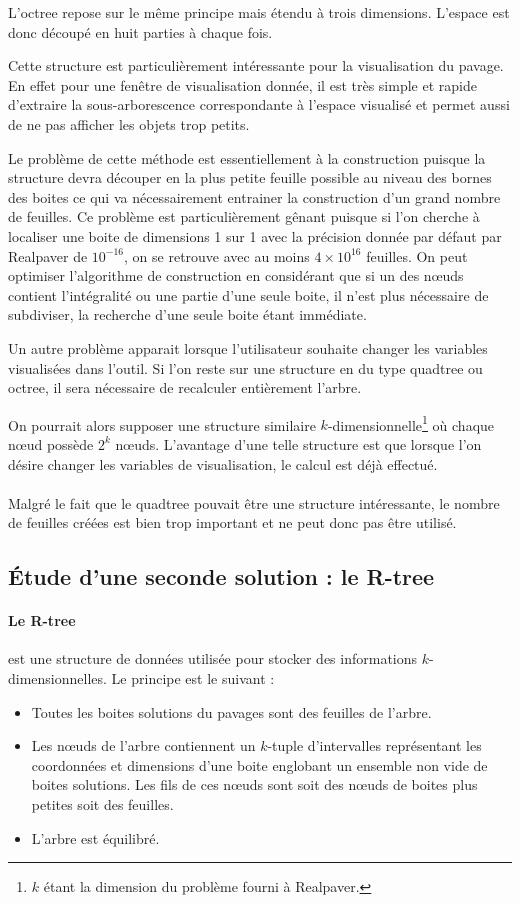 \documentclass[11pt,a4paper,utf8x]{report}
\begin{document}
L'octree repose sur le même principe mais étendu à trois dimensions. L'espace est donc découpé en huit parties à chaque fois.

Cette structure est particulièrement intéressante pour la visualisation du pavage. En effet pour une fenêtre de visualisation donnée, il est très simple et rapide d'extraire la sous-arborescence correspondante à l'espace visualisé et permet aussi de ne pas afficher les objets trop petits.

Le problème de cette méthode est essentiellement à la construction puisque la structure devra découper en la plus petite feuille possible au niveau des bornes des boites ce qui va nécessairement entrainer la construction d'un grand nombre de feuilles. Ce problème est particulièrement gênant puisque si l'on cherche à localiser une boite de dimensions 1 sur 1 avec la précision donnée par défaut par Realpaver de $10^{-16}$, on se retrouve avec au moins $4 \times 10^{16}$ feuilles. On peut optimiser l'algorithme de construction en considérant que si un des nœuds contient l'intégralité ou une partie d'une seule boite, il n'est plus nécessaire de subdiviser, la recherche d'une seule boite étant immédiate.

Un autre problème apparait lorsque l'utilisateur souhaite changer les variables visualisées dans l'outil. Si l'on reste sur une structure en du type quadtree ou octree, il sera nécessaire de recalculer entièrement l'arbre.

On pourrait alors supposer une structure similaire $k$-dimensionnelle\footnote{$k$ étant la dimension du problème fourni à Realpaver.} où chaque nœud possède $2^k$ nœuds. L'avantage d'une telle structure est que lorsque l'on désire changer les variables de visualisation, le calcul est déjà effectué.

\paragraph{} Malgré le fait que le quadtree pouvait être une structure intéressante, le nombre de feuilles créées est bien trop important et ne peut donc pas être utilisé.

\subsection{\'Etude d'une seconde solution : le R-tree}
\paragraph{Le R-tree}est une structure de données utilisée pour stocker des informations $k$-dimensionnelles. Le principe est le suivant :
\begin{itemize}
 \item Toutes les boites solutions du pavages sont des feuilles de l'arbre.
 \item Les nœuds de l'arbre contiennent un $k$-tuple d'intervalles représentant les coordonnées et dimensions d'une boite englobant un ensemble non vide de boites solutions. Les fils de ces nœuds sont soit des nœuds de boites plus petites soit des feuilles.
 \item L'arbre est équilibré.
\end{itemize}
\end{document}
